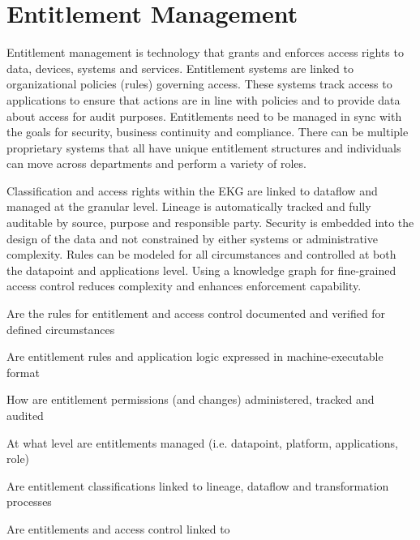 \section{Entitlement Management}\label{sec:ekgmm-b-4-4} %

Entitlement management is technology that grants and enforces access rights to data, devices, systems and services.
Entitlement systems are linked to organizational policies (rules) governing access.
These systems track access to applications to ensure that actions are in line with policies and to provide data about access for audit purposes.
Entitlements need to be managed in sync with the goals for security, business continuity and compliance.
There can be multiple proprietary systems that all have unique entitlement structures and individuals can move across departments and perform a variety of roles.

\kgmmekgrationalesection

Classification and access rights within the EKG are linked to dataflow and managed at the granular level.  Lineage is automatically tracked and fully auditable by source, purpose and responsible party.  Security is embedded into the design of the data and not constrained by either systems or administrative complexity.  Rules can be modeled for all circumstances and controlled at both the datapoint and applications level.  Using a knowledge graph for fine-grained access control reduces complexity and enhances enforcement capability.

\kgmmcorequestionssection

\begin{core-questions}

  \item [\thesection.1] Are the rules for entitlement and access control documented and verified for defined circumstances
  \item [\thesection.2] Are entitlement rules and application logic expressed in machine-executable format
  \item [\thesection.3] How are entitlement permissions (and changes) administered, tracked and audited
  \item [\thesection.4] At what level are entitlements managed (i.e. datapoint, platform, applications, role)
  \item [\thesection.5] Are entitlement classifications linked to lineage, dataflow and transformation processes
  \item [\thesection.6] Are entitlements and access control linked to 

\end{core-questions}

